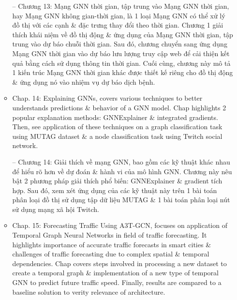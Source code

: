 \documentclass{article}
\begin{document}
\begin{itemize}
\begin{itemize}
        -- Chương 13: Mạng GNN thời gian, tập trung vào Mạng GNN thời gian, hay Mạng GNN không gian-thời gian, là 1 loại Mạng GNN có thể xử lý đồ thị với các cạnh \& đặc trưng thay đổi theo thời gian. Chương 1 giải thích khái niệm về đồ thị động \& ứng dụng của Mạng GNN thời gian, tập trung vào dự báo chuỗi thời gian. Sau đó, chương chuyển sang ứng dụng Mạng GNN thời gian vào dự báo lưu lượng truy cập web để cải thiện kết quả bằng cách sử dụng thông tin thời gian. Cuối cùng, chương này mô tả 1 kiến trúc Mạng GNN thời gian khác được thiết kế riêng cho đồ thị động \& ứng dụng nó vào nhiệm vụ dự báo dịch bệnh.
        \item Chap. 14: Explaining GNNs, covers various techniques to better understands predictions \& behavior of a GNN model. Chap highlights 2 popular explanation methods: GNNExplainer \& integrated gradients. Then, see application of these techniques on a graph classification task using MUTAG dataset \& a node classification task using Twitch social network.

        -- Chương 14: Giải thích về mạng GNN, bao gồm các kỹ thuật khác nhau để hiểu rõ hơn về dự đoán \& hành vi của mô hình GNN. Chương này nêu bật 2 phương pháp giải thích phổ biến: GNNExplainer \& gradient tích hợp. Sau đó, xem xét ứng dụng của các kỹ thuật này trên 1 bài toán phân loại đồ thị sử dụng tập dữ liệu MUTAG \& 1 bài toán phân loại nút sử dụng mạng xã hội Twitch.
        \item Chap. 15: Forecasting Traffic Using A3T-GCN, focuses on application of Temporal Graph Neural Networks in field of traffic forecasting. It highlights importance of accurate traffic forecasts in smart cities \& challenges of traffic forecasting due to complex spatial \& temporal dependencies. Chap covers steps involved in processing a new dataset to create a temporal graph \& implementation of a new type of temporal GNN to predict future traffic speed. Finally, results are compared to a baseline solution to verity relevance of architecture.


\end{itemize}
\end{itemize}
\end{document}
